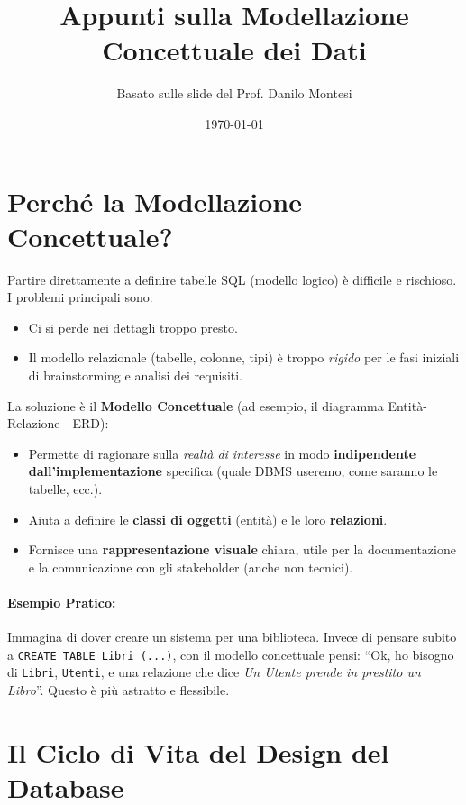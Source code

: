 \documentclass{article}
\title{Appunti sulla Modellazione Concettuale dei Dati}
\author{Basato sulle slide del Prof. Danilo Montesi}
\date{\today}
\begin{document}
	
	\maketitle
	\tableofcontents
	\newpage
	
	\section{Perché la Modellazione Concettuale?}
	
	Partire direttamente a definire tabelle SQL (modello logico) è difficile e rischioso. I problemi principali sono:
	\begin{itemize}
		\item Ci si perde nei dettagli troppo presto.
		\item Il modello relazionale (tabelle, colonne, tipi) è troppo \textit{rigido} per le fasi iniziali di brainstorming e analisi dei requisiti.
	\end{itemize}
	
	La soluzione è il \textbf{Modello Concettuale} (ad esempio, il diagramma Entità-Relazione - ERD):
	\begin{itemize}
		\item Permette di ragionare sulla \textit{realtà di interesse} in modo \textbf{indipendente dall'implementazione} specifica (quale DBMS useremo, come saranno le tabelle, ecc.).
		\item Aiuta a definire le \textbf{classi di oggetti} (entità) e le loro \textbf{relazioni}.
		\item Fornisce una \textbf{rappresentazione visuale} chiara, utile per la documentazione e la comunicazione con gli stakeholder (anche non tecnici).
	\end{itemize}
	
	\paragraph{Esempio Pratico:} Immagina di dover creare un sistema per una biblioteca. Invece di pensare subito a \texttt{CREATE TABLE Libri (...)}, con il modello concettuale pensi: ``Ok, ho bisogno di \texttt{Libri}, \texttt{Utenti}, e una relazione che dice \textit{Un Utente prende in prestito un Libro}''. Questo è più astratto e flessibile.
	
	\section{Il Ciclo di Vita del Design del Database}
	
\end{document}
